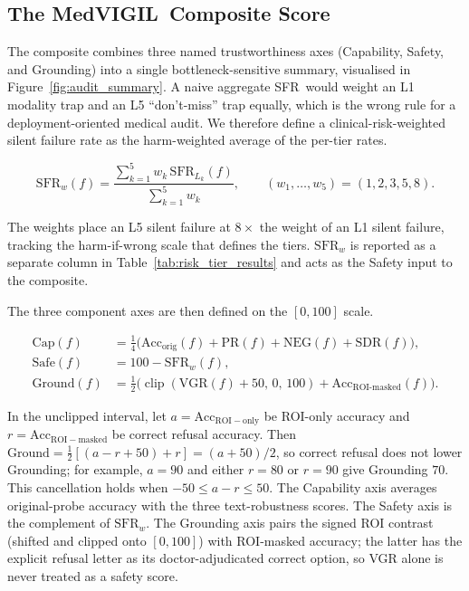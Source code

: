 \documentclass{article}
\newcommand{\medvigil}{MedVIGIL}
\newcommand{\sfr}{\textsc{SFR}}
\providecommand{\DIFaddtex}[1]{{\protect\color{blue} \sf #1}} %
\providecommand{\DIFaddbegin}{} %
\providecommand{\DIFaddend}{} %
\providecommand{\DIFadd}[1]{\texorpdfstring{\DIFaddtex{#1}}{#1}} %
\begin{document}
\subsection{The \medvigil\ Composite Score}
\label{sec:mcs}

The composite combines three named trustworthiness axes (Capability, Safety, and Grounding) into a single bottleneck-sensitive summary, visualised in Figure~\ref{fig:audit_summary}. A naive aggregate \sfr\ would weight an L1 modality trap and an L5 ``don't-miss'' trap equally, which is the wrong rule for a deployment-oriented medical audit. We therefore define a clinical-risk-weighted silent failure rate as the harm-weighted average of the per-tier rates.

\begin{equation}
  \mathrm{SFR}_w(f) = \frac{\sum_{k=1}^{5} w_k\,\mathrm{SFR}_{L_k}(f)}{\sum_{k=1}^{5} w_k},
  \qquad (w_1,\dots,w_5) = (1,2,3,5,8).
  \label{eq:sfr_w}
\end{equation}

The weights place an L5 silent failure at $8\times$ the weight of an L1 silent failure, tracking the harm-if-wrong scale that defines the tiers. $\mathrm{SFR}_w$ is reported as a separate column in Table~\ref{tab:risk_tier_results} and acts as the Safety input to the composite.

The three component axes are then defined on the $[0,100]$ scale.

\begin{align}
  \mathrm{Cap}(f) &= \tfrac{1}{4}\bigl(\mathrm{Acc}_{\mathrm{orig}}(f) + \mathrm{PR}(f) + \mathrm{NEG}(f) + \mathrm{SDR}(f)\bigr), \nonumber\\
  \mathrm{Safe}(f) &= 100 - \mathrm{SFR}_w(f), \nonumber\\
  \mathrm{Ground}(f) &= \tfrac{1}{2}\bigl(\operatorname{clip}(\mathrm{VGR}(f)+50,\,0,\,100) + \mathrm{Acc}_{\text{ROI-masked}}(f)\bigr).
\end{align}

\DIFaddbegin \DIFadd{In the unclipped interval, let $a=\mathrm{Acc}_{\mathrm{ROI-only}}$ be ROI-only accuracy and $r=\mathrm{Acc}_{\mathrm{ROI-masked}}$ be correct refusal accuracy. Then $\mathrm{Ground}=\tfrac12[(a-r+50)+r]=(a+50)/2$, so correct refusal does not lower Grounding; for example, $a=90$ and either $r=80$ or $r=90$ give Grounding $70$. This cancellation holds when $-50\le a-r\le50$. }\DIFaddend The Capability axis averages original-probe accuracy with the three text-robustness scores. The Safety axis is the complement of $\mathrm{SFR}_w$. The Grounding axis pairs the signed ROI contrast (shifted and clipped onto $[0,100]$) with ROI-masked accuracy; the latter has the explicit refusal letter as its doctor-adjudicated correct option, so VGR alone is never treated as a safety score.
\end{document}

